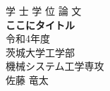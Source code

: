 \thispagestyle{empty}
\begin{center}
  \vspace*{20mm}
  {\LARGE 学 士 学 位 論 文\\}
  \vfill
  \textbf{{\huge ここにタイトル\\}}
  \vfill
  {\LARGE 令和4年度\\}
  \vfill
  {\LARGE 茨城大学工学部\\}
  \vfill
  {\LARGE 機械システム工学専攻\\}
  {\LARGE 佐藤 竜太\\}
  \vspace*{20mm}
\end{center}
\newpage
